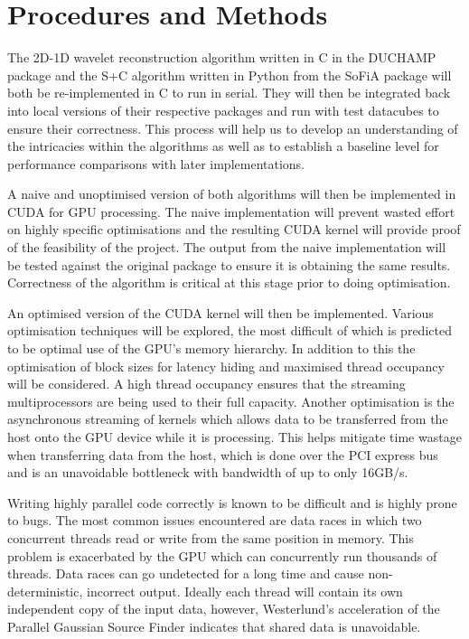 \documentclass[prodmode,acmtecs]{acmsmall} \usepackage[ruled]{algorithm2e}
\begin{document}
\section{Procedures and Methods}


The 2D-1D wavelet reconstruction algorithm written in C in the DUCHAMP package and the S+C algorithm written in Python from the SoFiA package will both be re-implemented in C to run in serial. They will then be integrated back into local versions of their respective packages and run with test datacubes to ensure their correctness. This process will help us to develop an understanding of the intricacies within the algorithms as well as to establish a baseline level for performance comparisons
with later implementations.


A naive and unoptimised version of both algorithms will then be implemented in CUDA for GPU processing. The naive implementation will prevent wasted effort on highly specific optimisations and the resulting CUDA kernel will provide proof of the feasibility of the project. The output from the naive implementation will be tested against the original package to ensure it is obtaining the same results. Correctness of the algorithm is critical at this stage prior to doing optimisation.


An optimised version of the CUDA kernel will then be implemented. Various optimisation techniques will be explored, the most difficult of which is predicted to be optimal use of the GPU’s memory hierarchy. In addition to this the optimisation of block sizes for latency hiding and maximised thread occupancy will be considered. A high thread occupancy ensures that the streaming multiprocessors are being used to their full capacity. Another optimisation is the asynchronous streaming of
kernels which allows data to be transferred from the host onto the GPU device while it is processing. This helps mitigate time wastage when transferring data from the host, which is done over the PCI express bus and is an unavoidable bottleneck with bandwidth of up to only 16GB/s.


Writing highly parallel code correctly is known to be difficult and is highly prone to bugs\cite{boyer2008automated}. The most common issues encountered are data races in which two concurrent threads read or write from the same position in memory. This problem is exacerbated by the GPU which can concurrently run thousands of threads. Data races can go undetected for a long time and cause non-deterministic, incorrect output. Ideally each thread will contain its own independent copy of the input data, however,
Westerlund’s \cite{westerlund2015performance} acceleration of the Parallel Gaussian Source Finder indicates that shared data is unavoidable.
\end{document}
